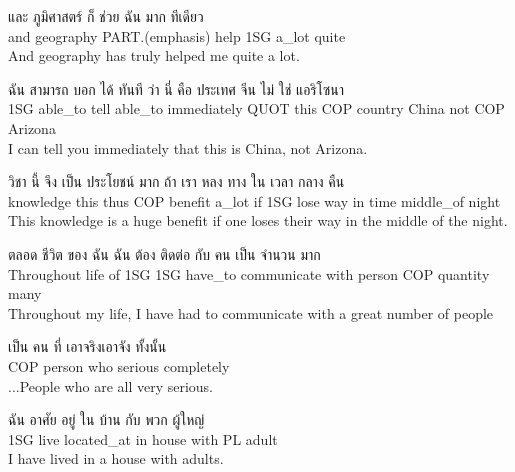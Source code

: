 \documentclass{book}
\begin{document}
	\begin{exe}
		\ex
		\gll และ ภูมิศาสตร์ ก็ ช่วย ฉัน มาก ทีเดียว\\
		and geography \textsc{PART}.(emphasis) help \textsc{1SG} a_lot quite\\
		And geography has truly helped me quite a lot.
	\end{exe}

	\begin{exe}
		\ex
		\gll ฉัน สามารถ บอก ได้ ทันที ว่า นี่ คือ ประเทศ จีน ไม่ ใช่ แอริโซนา\\
		\textsc{1SG} able_to tell able\_to immediately \textsc{QUOT} this \textsc{COP} country China not \textsc{COP} Arizona\\
		I can tell you immediately that this is China, not Arizona.
	\end{exe}

	\begin{exe}
		\ex
		\gll วิชา นี้ จึง เป็น ประโยชน์ มาก ถ้า เรา หลง ทาง ใน เวลา กลาง คืน\\
		knowledge this thus \textsc{COP} benefit a\_lot if \textsc{1SG} lose way in time middle_of night\\
		This knowledge is a huge benefit if one loses their way in the middle of the night.
	\end{exe}

	\begin{exe}
		\ex
		\gll ตลอด ชีวิต ของ ฉัน ฉัน ต้อง ติดต่อ กับ คน เป็น จำนวน มาก\\
		Throughout life of \textsc{1SG} \textsc{1SG} have\_to communicate with person \textsc{COP} quantity many\\
		Throughout my life, I have had to communicate with a great number of people
	\end{exe}

	\begin{exe}
		\ex
		\gll เป็น คน ที่ เอาจริงเอาจัง ทั้งนั้น\\
		\textsc{COP} person who serious completely\\
		...People who are all very serious.
	\end{exe}

	\begin{exe}
		\ex
		\gll ฉัน อาศัย อยู่ ใน บ้าน กับ พวก ผู้ใหญ่\\
		\textsc{1SG} live located\_at in house with \textsc{PL} adult\\
		I have lived in a house with adults.
	\end{exe}
\end{document}
